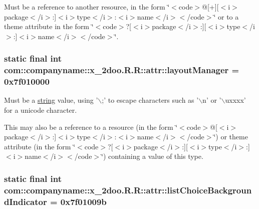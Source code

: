 Must be a reference to another resource, in the form \char`\"{}$<$code$>$@\mbox{[}+\mbox{]}\mbox{[}$<$i$>$package$<$/i$>$:\mbox{]}$<$i$>$type$<$/i$>$:$<$i$>$name$<$/i$>$$<$/code$>$\char`\"{} or to a theme attribute in the form \char`\"{}$<$code$>$?\mbox{[}$<$i$>$package$<$/i$>$:\mbox{]}\mbox{[}$<$i$>$type$<$/i$>$:\mbox{]}$<$i$>$name$<$/i$>$$<$/code$>$\char`\"{}. \hypertarget{classcom_1_1companyname_1_1x__2doo_1_1_r_1_1attr_7436f659215fa9322f2083024664d1b9}{
\subsubsection[{layoutManager}]{\setlength{\rightskip}{0pt plus 5cm}static final int com::companyname::x\_\-2doo.R.R::attr::layoutManager = 0x7f010000}}
\label{classcom_1_1companyname_1_1x__2doo_1_1_r_1_1attr_7436f659215fa9322f2083024664d1b9}


Must be a \hyperlink{classcom_1_1companyname_1_1x__2doo_1_1_r_1_1string}{string} value, using '$\backslash$;' to escape characters such as '$\backslash$n' or '$\backslash$uxxxx' for a unicode character. 

This may also be a reference to a resource (in the form \char`\"{}$<$code$>$@\mbox{[}$<$i$>$package$<$/i$>$:\mbox{]}$<$i$>$type$<$/i$>$:$<$i$>$name$<$/i$>$$<$/code$>$\char`\"{}) or theme attribute (in the form \char`\"{}$<$code$>$?\mbox{[}$<$i$>$package$<$/i$>$:\mbox{]}\mbox{[}$<$i$>$type$<$/i$>$:\mbox{]}$<$i$>$name$<$/i$>$$<$/code$>$\char`\"{}) containing a value of this type. \hypertarget{classcom_1_1companyname_1_1x__2doo_1_1_r_1_1attr_bc8acb5047c51ac2b090c2c0d027aed3}{
\subsubsection[{listChoiceBackgroundIndicator}]{\setlength{\rightskip}{0pt plus 5cm}static final int com::companyname::x\_\-2doo.R.R::attr::listChoiceBackgroundIndicator = 0x7f01009b}}
\label{classcom_1_1companyname_1_1x__2doo_1_1_r_1_1attr_bc8acb5047c51ac2b090c2c0d027aed3}


